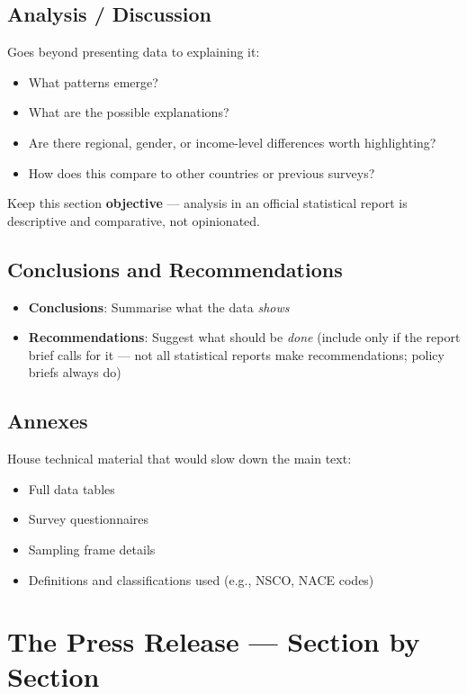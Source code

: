 \documentclass[11pt,a4paper,oneside]{book}
\begin{document}
\subsection*{Analysis / Discussion}
Goes beyond presenting data to explaining it:
\begin{itemize}
    \item What patterns emerge?
    \item What are the possible explanations?
    \item Are there regional, gender, or income-level differences worth highlighting?
    \item How does this compare to other countries or previous surveys?
\end{itemize}

Keep this section \textbf{objective} --- analysis in an official statistical report is descriptive and comparative, not opinionated.

\subsection*{Conclusions and Recommendations}
\begin{itemize}
    \item \textbf{Conclusions}: Summarise what the data \emph{shows}
    \item \textbf{Recommendations}: Suggest what should be \emph{done} (include only if the report brief calls for it --- not all statistical reports make recommendations; policy briefs always do)
\end{itemize}

\subsection*{Annexes}
House technical material that would slow down the main text:
\begin{itemize}
    \item Full data tables
    \item Survey questionnaires
    \item Sampling frame details
    \item Definitions and classifications used (e.g., NSCO, NACE codes)
\end{itemize}

\section{The Press Release --- Section by Section}
\end{document}
